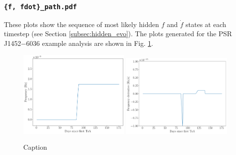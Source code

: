 \documentclass{article}
\begin{document}
\subsubsection{\texttt{\{f, fdot\}\_path.pdf}}
These plots show the sequence of most likely hidden $f$ and $\dot{f}$ states at each timestep (see Section \ref{subsec:hidden_evo}).
The plots generated for the PSR J1452$-$6036 example analysis are shown in Fig. \ref{fig:eg_paths}.
\begin{figure}
    \centering
    \includegraphics[width=0.49\textwidth]{figures/J1452-6036_f_path.pdf}
    \includegraphics[width=0.49\textwidth]{figures/J1452-6036_fdot_path.pdf}
    \caption{Caption}
    \label{fig:eg_paths}
\end{figure}
\end{document}
